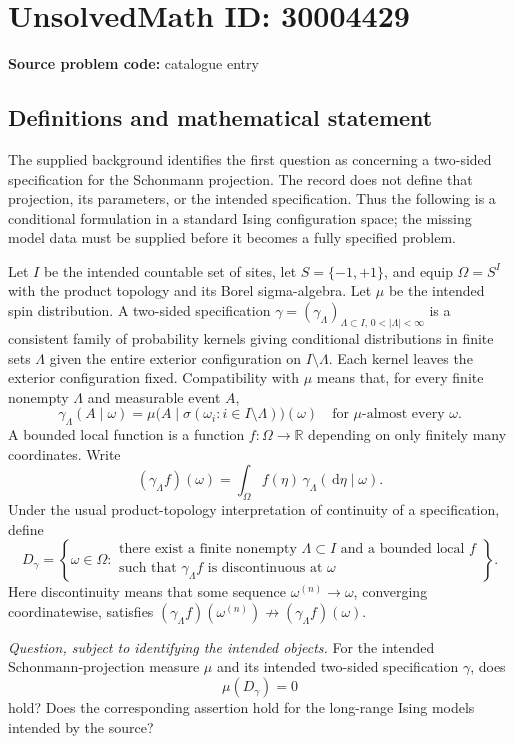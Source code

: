 \documentclass[11pt]{article}
\newcommand{\R}{\mathbb{R}}
\newcommand{\dd}{\,\mathrm{d}}
\begin{document}
\section*{UnsolvedMath ID: 30004429}
\textbf{Source problem code:} catalogue entry
\subsection{Definitions and mathematical statement}
The supplied background identifies the first question as concerning a two-sided specification for the Schonmann projection. The record does not define that projection, its parameters, or the intended specification. Thus the following is a conditional formulation in a standard Ising configuration space; the missing model data must be supplied before it becomes a fully specified problem.

Let \(I\) be the intended countable set of sites, let \(S=\{-1,+1\}\), and equip \(\Omega=S^I\) with the product topology and its Borel sigma-algebra. Let \(\mu\) be the intended spin distribution. A two-sided specification \(\gamma=(\gamma_\Lambda)_{\Lambda\subset I,\,0<|\Lambda|<\infty}\) is a consistent family of probability kernels giving conditional distributions in finite sets \(\Lambda\) given the entire exterior configuration on \(I\setminus\Lambda\). Each kernel leaves the exterior configuration fixed. Compatibility with \(\mu\) means that, for every finite nonempty \(\Lambda\) and measurable event \(A\),
\[
\gamma_\Lambda(A\mid\omega)
=\mu\bigl(A\mid\sigma(\omega_i:i\in I\setminus\Lambda)\bigr)(\omega)
\quad\text{for \(\mu\)-almost every \(\omega\).}
\]
A bounded local function is a function \(f:\Omega\to\R\) depending on only finitely many coordinates. Write
\[
(\gamma_\Lambda f)(\omega)
=\int_\Omega f(\eta)\,\gamma_\Lambda(\dd\eta\mid\omega).
\]
Under the usual product-topology interpretation of continuity of a specification, define
\[
D_\gamma=
\left\{\omega\in\Omega:
\begin{array}{l}
\text{there exist a finite nonempty \(\Lambda\subset I\) and a bounded local \(f\)}\\
\text{such that \(\gamma_\Lambda f\) is discontinuous at \(\omega\)}
\end{array}
\right\}.
\]
Here discontinuity means that some sequence \(\omega^{(n)}\to\omega\), converging coordinatewise, satisfies
\( (\gamma_\Lambda f)(\omega^{(n)})\not\to(\gamma_\Lambda f)(\omega) \).

\emph{Question, subject to identifying the intended objects.} For the intended Schonmann-projection measure \(\mu\) and its intended two-sided specification \(\gamma\), does
\[
\mu(D_\gamma)=0
\]
hold? Does the corresponding assertion hold for the long-range Ising models intended by the source?
\end{document}
